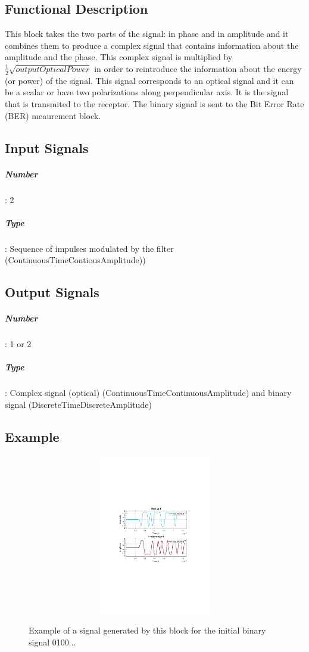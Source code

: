 \begin{refsection}
\subsection*{Functional Description}
This block takes the two parts of the signal: in phase and in amplitude and it combines them to produce a complex signal that contains information about the amplitude and the phase.
This complex signal is multiplied by $\frac{1}{2}\sqrt{\textit{outputOpticalPower}}$ in order to reintroduce the information about the energy (or power) of the signal. This signal corresponds to an optical signal and it can be a scalar or have two polarizations along perpendicular axis. It is the signal that is transmited to the receptor.
The binary signal is sent to the Bit Error Rate (BER) meaurement block.
\subsection*{Input Signals}
\subparagraph*{Number}: 2
\subparagraph*{Type}: Sequence of impulses modulated by the filter (ContinuousTimeContiousAmplitude))
\subsection*{Output Signals}
\subparagraph*{Number}: 1 or 2
\subparagraph*{Type}: Complex signal (optical) (ContinuousTimeContinuousAmplitude) and binary signal (DiscreteTimeDiscreteAmplitude)
\subsection*{Example}
\begin{figure}[h]
	\centering
	\includegraphics[width=1.0\textwidth, height=7cm]{./lib/iq_modulator/figures/MQAM_iq_modulator_output.pdf}
	\label{MQAM8_DeterministicAppendZeros}\caption{Example of a signal generated by this block for the initial binary signal 0100...}
\end{figure}

\end{refsection}
